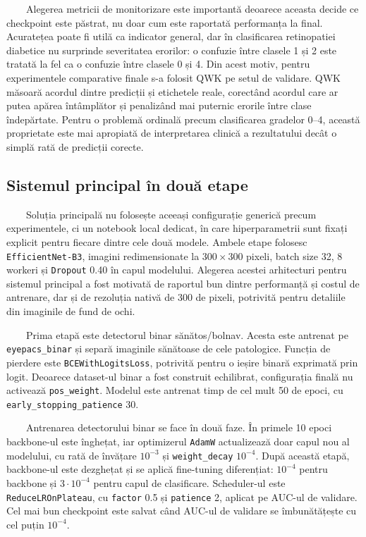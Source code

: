 \documentclass[12pt, a4paper, twoside, romanian]{teza-upb}
\begin{document}
\ \ \ \ Alegerea metricii de monitorizare este importantă deoarece aceasta decide ce checkpoint este
păstrat, nu doar cum este raportată performanța la final. Acuratețea poate fi utilă ca indicator
general, dar în clasificarea retinopatiei diabetice nu surprinde severitatea erorilor: o confuzie între
clasele 1 și 2 este tratată la fel ca o confuzie între clasele 0 și 4. Din acest motiv, pentru
experimentele comparative finale s-a folosit QWK pe setul de validare. QWK măsoară acordul dintre
predicții și etichetele reale, corectând acordul care ar putea apărea întâmplător și penalizând mai
puternic erorile între clase îndepărtate. Pentru o problemă ordinală precum clasificarea gradelor
0--4, această proprietate este mai apropiată de interpretarea clinică a rezultatului decât o simplă
rată de predicții corecte.

\subsection*{Sistemul principal în două etape}

\ \ \ \ Soluția principală nu folosește aceeași configurație generică precum experimentele, ci un
notebook local dedicat, în care hiperparametrii sunt fixați explicit pentru fiecare dintre cele două
modele. Ambele etape folosesc \texttt{EfficientNet-B3}, imagini redimensionate la \(300 \times 300\)
pixeli, batch size 32, 8 workeri și \texttt{Dropout} 0.40 în capul modelului. Alegerea acestei
arhitecturi pentru sistemul principal a fost motivată de raportul bun dintre performanță și costul de
antrenare, dar și de rezoluția nativă de 300 de pixeli, potrivită pentru detaliile din imaginile de
fund de ochi.
\bigskip

\ \ \ \ Prima etapă este detectorul binar sănătos/bolnav. Acesta este antrenat pe
\texttt{eyepacs\_binar} și separă imaginile sănătoase de cele patologice. Funcția de pierdere este
\texttt{BCEWithLogitsLoss}, potrivită pentru o ieșire binară exprimată prin logit. Deoarece dataset-ul
binar a fost construit echilibrat, configurația finală nu activează \texttt{pos\_weight}. Modelul este
antrenat timp de cel mult 50 de epoci, cu \texttt{early\_stopping\_patience} 30.
\bigskip

\ \ \ \ Antrenarea detectorului binar se face în două faze. În primele 10 epoci backbone-ul este
înghețat, iar optimizerul \texttt{AdamW} actualizează doar capul nou al modelului, cu rată de învățare
\(10^{-3}\) și \texttt{weight\_decay} \(10^{-4}\). După această etapă, backbone-ul este dezghețat și
se aplică fine-tuning diferențiat: \(10^{-4}\) pentru backbone și \(3 \cdot 10^{-4}\) pentru capul de
clasificare. Scheduler-ul este \texttt{ReduceLROnPlateau}, cu \texttt{factor} 0.5 și \texttt{patience}
2, aplicat pe AUC-ul de validare. Cel mai bun checkpoint este salvat când AUC-ul de validare se
îmbunătățește cu cel puțin \(10^{-4}\).
\bigskip
\end{document}
